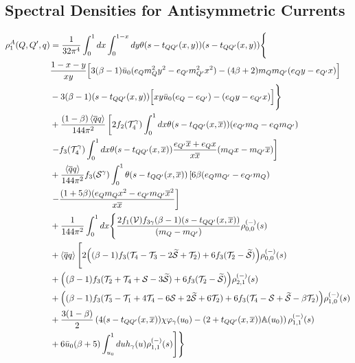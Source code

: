 \subsection{Spectral Densities for Antisymmetric Currents}
%
\begin{align}
        \nonumber\rho_1^A(Q,Q^\prime,q) &= \dfrac{1}{32\pi^4}\int_0^1 dx \int_0^{1-x} dy \theta(s-t_{QQ^\prime}(x,y))(s-t_{QQ^\prime}(x,y))\Bigg\{\\
        \nonumber&\dfrac{1-x-y}{xy}\Big[3(\beta-1)\bar{u}_0(e_Qm_Q^2y^2-e_{Q^\prime}m_{Q^\prime}^2x^2)-(4\beta+2)m_Qm_{Q^\prime}(e_Qy-e_{Q^\prime}x)\Big]\\
        \nonumber&-3(\beta-1)(s-t_{QQ^\prime}(x,y))\Big[xy\bar{u}_0(e_Q-e_{Q^\prime})-(e_Qy-e_{Q^\prime}x)\Big]\Bigg\}\\
        \nonumber&+\dfrac{(1-\beta)\left\langle\overline{q}q\right\rangle}{144\pi^2}\left[2f_2(\mathcal{T}_4^\gamma)\int_0^1dx\theta(s-t_{QQ^\prime}(x,\overline{x}))(e_{Q^\prime}m_Q-e_Qm_{Q^\prime})\right.\\
        \nonumber&\left.-f_3(\mathcal{T}_4^\gamma)\int_0^1dx\theta(s-t_{QQ^\prime}(x,\overline{x}))\dfrac{e_{Q^\prime}\overline{x}+e_Qx}{x\overline{x}}(m_Qx-m_{Q^\prime}\overline{x})\right]\\
        \nonumber&+\dfrac{\left\langle\overline{q}q\right\rangle}{144\pi^2}f_3(\mathcal{S}^\gamma)\int_0^1\theta(s-t_{QQ^\prime}(x,\overline{x})) \left[6\beta(e_Qm_{Q^\prime}-e_{Q^\prime}m_Q)\right.\\
        &\left.-\dfrac{(1+5\beta)(e_Qm_Qx^2-e_{Q^\prime}m_{Q^\prime}\overline{x}^2}{x\overline{x}}\right]\\
        \nonumber&+\dfrac{1}{144\pi^2}\int_0^1 dx \Bigg\{\dfrac{2f_1(\mathcal{V}) f_{3\gamma} (\beta-1)(s-t_{QQ^\prime}(x,\overline{x}))}{(m_Q-m_{Q^\prime})}\rho^{(-)}_{0,0}(s)\\
        \nonumber&+\left\langle\overline{q}q\right\rangle\Bigg[2\Big( (\beta-1)f_3(\mathcal{T}_4-\mathcal{T}_3-2\widetilde{\mathcal{S}}+\mathcal{T}_2)+6f_3(\mathcal{T}_2-\widetilde{\mathcal{S}}) \Big)\rho^{(-)}_{0,0}(s)\\
        \nonumber&+\Big( (\beta-1)f_3(\mathcal{T}_2+\mathcal{T}_4+\mathcal{S}-3\widetilde{\mathcal{S}}) + 6f_3(\mathcal{T}_2-\widetilde{\mathcal{S}})\Big)\rho^{(-)}_{2,1}(s)\\
        \nonumber&+\Big( (\beta-1)f_3(\mathcal{T}_3-\mathcal{T}_1+4\mathcal{T}_4-6\mathcal{S}+2\widetilde{\mathcal{S}}+6\mathcal{T}_2)+6f_3(\mathcal{T}_4-\mathcal{S}+\widetilde{\mathcal{S}}-\beta\mathcal{T}_2)\Big)\rho^{(-)}_{1,0}(s)\\
        \nonumber&+\dfrac{3(1-\beta)}{2}\left(4(s-t_{QQ^\prime}(x,\overline{x}))\chi \varphi_\gamma(u_0) - (2+t_{QQ^\prime}(x,\overline{x}))\mathbb{A}(u_0)\right)\rho^{(-)}_{1,1}(s)\\
        \nonumber&+6\bar{u}_0(\beta+5) \int_{u_0}^1 du  h_\gamma(u) \rho^{(-)}_{1,1}(s)\Bigg]\Bigg\}
\end{align}

